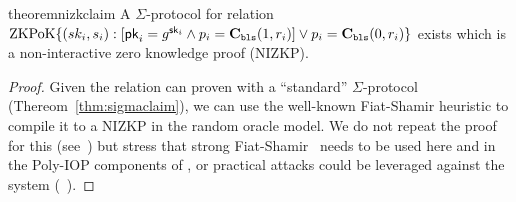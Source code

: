
\begin{restatable}{theorem}{nizkclaim}
\label{thm:nizkclaim}
A $\Sigma$-protocol for relation $\mathrm{ZKPoK} \{ (sk_i,s_i) :  [\mathsf{pk}_i=g^{\mathsf{sk}_i} \land p_i=\textbf{C}_\texttt{bls}(1,r_i)  ] \lor p_i=\textbf{C}_\texttt{bls}(0,r_i) \}$ exists which is a non-interactive zero knowledge proof (NIZKP).
\end{restatable}
    
\begin{proof}
Given the relation can proven with a ``standard'' $\Sigma$-protocol (Thereom~\ref{thm:sigmaclaim}), we can use the well-known Fiat-Shamir heuristic to compile it to a NIZKP in the random oracle model. We do not repeat the proof for this (see~\cite{damgard10,sigma}) but stress that strong Fiat-Shamir~\cite{weakfs} needs to be used here and in the Poly-IOP components of \Sys, or practical attacks could be leveraged against the system (\cf~\cite{weakfsattacks}).
\end{proof}

